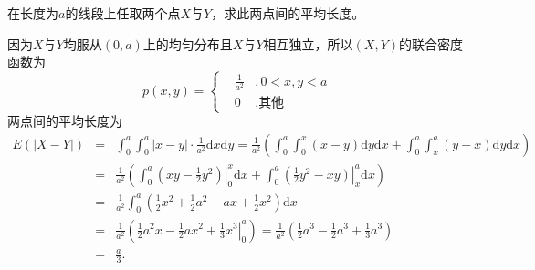\begin{example}
在长度为$a$的线段上任取两个点$X$与$Y$，求此两点间的平均长度。
\end{example}
\begin{solution}
因为$X$与$Y$均服从$(0,a)$上的均匀分布且$X$与$Y$相互独立，所以$(X,Y)$的联合密度函数为
$$p(x, y)=\left\{\begin{aligned}
&\frac{1}{a^{2}}&,0<x,y<a\\
&0&,\text{其他}
\end{aligned}\right.$$
两点间的平均长度为
\begin{eqnarray*}
    E(|X-Y|) &=&\int_{0}^{a} \int_{0}^{a}|x-y| \cdot \frac{1}{a^{2}} \text{d} x \text{d} y=\frac{1}{a^{2}}\left(\int_{0}^{a} \int_{0}^{x}(x-y) \text{d} y \text{d} x+\int_{0}^{a} \int_{x}^{a}(y-x) \text{d} y \text{d} x\right) \\
&=&\frac{1}{a^{2}}\left(\int_{0}^{a} \left(x y-\left.\frac{1}{2} y^{2}\right)\right|_{0} ^{x} \text{d} x+\int_{0}^{a} \left(\frac{1}{2} y^{2}-\left.x y\right)\right|_{x} ^{a} \text{d} x\right) \\
&=&\frac{1}{a^{2}} \int_{0}^{a}\left(\frac{1}{2} x^{2}+\frac{1}{2} a^{2}-a x+\frac{1}{2} x^{2}\right) \text{d} x \\
&=&\frac{1}{a^{2}}\left(\frac{1}{2} a^{2} x-\frac{1}{2} a x^{2}+\left.\frac{1}{3} x^{3}\right|_{0} ^{a}\right) = \frac{1}{a^{2}}\left(\frac{1}{2} a^{3}-\frac{1}{2} a^{3}+\frac{1}{3} a^{3}\right)\\
&=&\frac{a}{3}.
\end{eqnarray*}
\end{solution}

